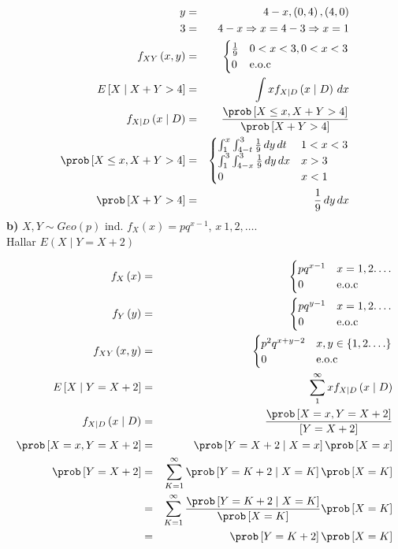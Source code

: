 \begin{enumerate}
\begin{eqnarray*}
y&=& 4-x, \left(0,4 \right), \left(4,0 \right)\\
3 &=& 4-x \Rightarrow x= 4-3 \Rightarrow x=1\\
f_{XY} \left(x,y \right) &=& \begin{cases}
\frac{1}{9} & 0<x<3, 0<x<3\\
0 & \textrm{e.o.c}
\end{cases}\\
E \left[X \mid X+Y > 4 \right] &=& \int x f_{X\mid D} \left( x \mid D \right) \, dx\\
f_{X\mid D} \left( x \mid D \right) &=& \dfrac{\prob \left[X \leq x , X+Y > 4\right] }{\prob \left[X+Y > 4 \right]  }\\
\prob \left[X \leq x , X+Y > 4\right] &=& \begin{cases}
\int_{1}^{x} \int_{4-t}^{3} \frac{1}{9} \, dy \, dt & 1<x<3\\
\int_{1}^{3} \int_{4-x}^{3}  \frac{1}{9} \, dy \, dx & x>3\\
0 & x<1
\end{cases}\\
\prob \left[X+Y > 4 \right] &=& \frac{1}{9} \, dy \, dx
\end{eqnarray*}
\textbf{b)} $X,Y \sim Geo \left(p \right)$ ind. $f_{X}\left(x \right)= pq^{x-1}$, $x\ 1,2, \ldots$. \\ Hallar $E \left(X \mid Y = X+2 \right)$

\begin{eqnarray*}
f_{X}\left(x \right) &=& \begin{cases}
pq^{x-1} & x=1,2.\ldots\\
0 & \textrm{e.o.c}
\end{cases}\\
f_{Y}\left( y\right) &=& \begin{cases}
pq^{y-1} & x=1,2.\ldots\\
0 & \textrm{e.o.c}
\end{cases}\\
f_{XY}\left(x,y \right) &=& \begin{cases}
p^{2}q^{x+y-2} & x,y \in \left\{1,2.\ldots \right\} \\
0 & \textrm{e.o.c}
\end{cases}\\
E \left[X \mid Y = X+2 \right]&=& \sum_{1}^{\infty} x f_{X\mid D}\left(x\mid D \right)\\
f_{X\mid D}\left(x\mid D \right)&=& \dfrac{\prob \left[X=x, Y=X+2 \right] }{
\left[Y=X+2 \right] }\\
\prob \left[X=x, Y = X+2\right]&=& \prob \left[Y=X+2 \mid X=x \right]\prob \left[X=x \right]\\
\prob \left[Y=X+2 \right]&=& \sum_{K=1}^{\infty} \prob \left[Y=K+2 \mid X=K \right] \prob \left[X=K \right]\\
&=& \sum_{K=1}^{\infty}\dfrac{ \prob \left[Y=K+2 \mid X=K \right]}{\prob \left[X=K \right]} \prob \left[X=K \right]\\
&=& \prob \left[Y=K+2  \right] \prob \left[X=K \right]
\end{eqnarray*}


\end{enumerate}
